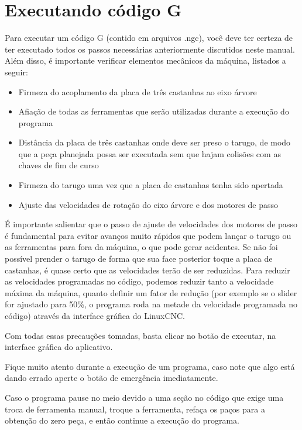 \documentclass[twoside,a4paper]{refart}
\begin{document}
\section{Executando código G}

Para executar um código G (contido em arquivos .ngc), você deve ter certeza de ter executado todos os passos necessárias anteriormente discutidos neste manual. Além disso, é importante verificar elementos mecânicos da máquina, listados a seguir:

\begin{itemize}
    \item Firmeza do acoplamento da placa de três castanhas ao eixo árvore 
    \item Afiação de todas as ferramentas que serão utilizadas durante a execução do programa 
    \item Distância da placa de três castanhas onde deve ser preso o tarugo, de modo que a peça planejada possa ser executada sem que hajam colisões com as chaves de fim de curso
    \item Firmeza do tarugo uma vez que a placa de castanhas tenha sido apertada
    \item Ajuste das velocidades de rotação do eixo árvore e dos motores de passo
\end{itemize}

É importante salientar que o passo de ajuste de velocidades dos motores de passo é fundamental para evitar avanços muito rápidos que podem lançar o tarugo ou as ferramentas para fora da máquina, o que pode gerar acidentes. Se não foi possível prender o tarugo de forma que sua face posterior toque a placa de castanhas, é quase certo que as velocidades terão de ser reduzidas. Para reduzir as velocidades programadas no código, podemos reduzir tanto a velocidade máxima da máquina, quanto definir um fator de redução (por exemplo se o slider for ajustado para 50\%, o programa roda na metade da velocidade programada no código) através da interface gráfica do LinuxCNC.

Com todas essas precauções tomadas, basta clicar no botão de executar, na interface gráfica do aplicativo. 

\attention Fique muito atento durante a execução de um programa, caso note que algo está dando errado aperte o botão de emergência imediatamente.

\attention Caso o programa pause no meio devido a uma seção no código que exige uma troca de ferramenta manual, troque a ferramenta, refaça os paços para a obtenção do zero peça, e então continue a execução do programa.  
\end{document}
